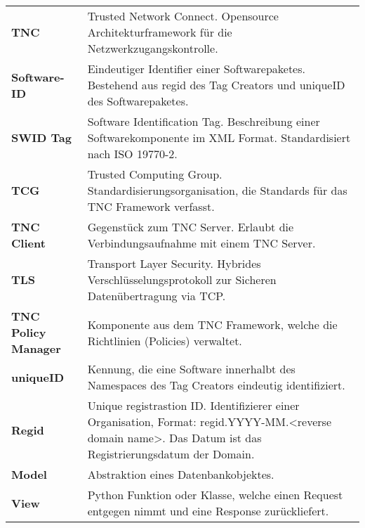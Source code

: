 \begin{longtable}{ll}
\textbf{TNC} & Trusted Network Connect. Opensource Architekturframework für die Netzwerkzugangskontrolle.\\

\textbf{Software-ID} & Eindeutiger Identifier einer Softwarepaketes. Bestehend aus regid des Tag Creators und uniqueID des Softwarepaketes.\\

\textbf{SWID Tag} & Software Identification Tag. Beschreibung einer Softwarekomponente im XML Format. Standardisiert nach ISO 19770-2.\\

\textbf{TCG} & Trusted Computing Group. Standardisierungsorganisation, die Standards für das TNC Framework verfasst.\\
 
\textbf{TNC Client} & Gegenstück zum TNC Server. Erlaubt die Verbindungsaufnahme mit einem TNC Server.\\

\textbf{TLS} & Transport Layer Security. Hybrides Verschlüsselungsprotokoll zur Sicheren Datenübertragung via TCP.\\

\textbf{TNC Policy Manager} & Komponente aus dem TNC Framework, welche die Richtlinien (Policies) verwaltet.\\

\textbf{uniqueID} & Kennung, die eine Software innerhalbt des Namespaces des Tag Creators eindeutig identifiziert.\\

\textbf{Regid} & Unique registrastion ID. Identifizierer einer Organisation, Format: regid.YYYY-MM.<reverse domain name>. Das Datum ist das Registrierungsdatum der Domain.\\

\textbf{Model} & Abstraktion eines Datenbankobjektes.\\

\textbf{View} & Python Funktion oder Klasse, welche einen Request entgegen nimmt und eine Response zurückliefert.\\

\end{longtable}